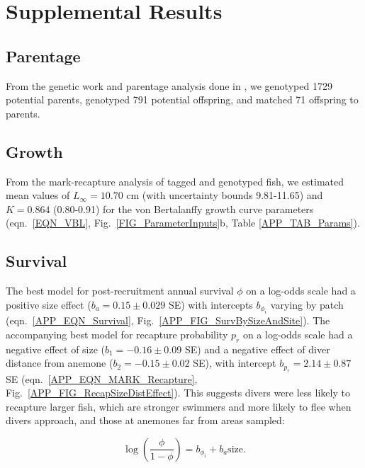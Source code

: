 \documentclass[12pt, oneside]{article}   	%
\begin{document}
\newpage{}{}

\section{Supplemental Results}  %

\subsection{Parentage} \label{APP_SEC_RESULTS_Parentage}

From the genetic work and parentage analysis done in \cite{catalanoInPrepconnectivity}, we genotyped 1729 potential parents, genotyped 791 potential offspring, and matched 71 offspring to parents.

\subsection{Growth} \label{APP_SEC_RESULTS_Growth}

From the mark-recapture analysis of tagged and genotyped fish, we estimated mean values of $L_\infty = 10.70$ cm (with uncertainty bounds 9.81-11.65) and $K = 0.864$ (0.80-0.91) for the von Bertalanffy growth curve parameters (eqn.\ \ref{EQN_VBL}, Fig.\ \ref{FIG_ParameterInputs}b, Table \ref{APP_TAB_Params}). 

\subsection{Survival} \label{APP_SEC_RESULTS_Survival}

The best model for post-recruitment annual survival $\phi$ on a log-odds scale had a positive size effect ($b_a = 0.15 \pm 0.029$ SE) with intercepts $b_{\phi_i}$ varying by patch (eqn.\ \ref{APP_EQN_Survival}, Fig.\ \ref{APP_FIG_SurvBySizeAndSite}). The accompanying best model for recapture probability $p_r$ on a log-odds scale had a negative effect of size ($b_1 = -0.16 \pm 0.09$ SE) and a negative effect of diver distance from anemone ($b_2 = -0.15 \pm 0.02$ SE), with intercept $b_{p_r} = 2.14 \pm 0.87$ SE (eqn.\ \ref{APP_EQN_MARK_Recapture}, Fig.\ \ref{APP_FIG_RecapSizeDistEffect}). This suggests divers were less likely to recapture larger fish, which are stronger swimmers and more likely to flee when divers approach, and those at anemones far from areas sampled:

\begin{equation}
\log(\frac{\phi}{1-\phi}) = b_{\phi_i} + b_a\text{size}. \label{APP_EQN_Survival}
\end{equation}
\end{document}
